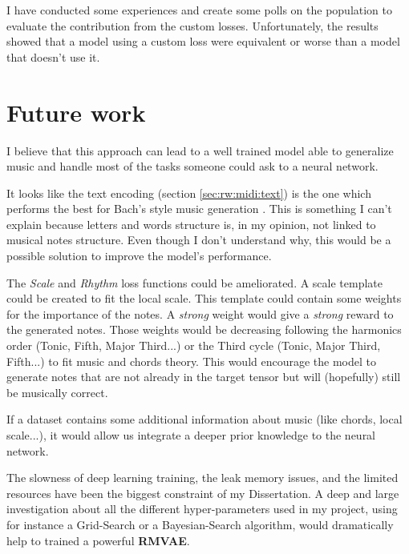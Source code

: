\documentclass[12pt]{report}
\begin{document}
I have conducted some experiences and create some polls on the population to evaluate the contribution from the custom losses.
Unfortunately, the results showed that a model using a custom loss were equivalent or worse than a model that doesn't use it.


\section*{Future work}

I believe that this approach can lead to a well trained model able to generalize music and handle most of the tasks someone could ask to a neural network.

It looks like the text encoding (section \ref{sec:rw:midi:text}) is the one which performs the best for Bach's style music generation \cite{hadjeres_deepbach:_2016, liang_automatic_2017}.
This is something I can't explain because letters and words structure is, in my opinion, not linked to musical notes structure.
Even though I don't understand why, this would be a possible solution to improve the model's performance.

The \textit{Scale} and \textit{Rhythm} loss functions could be ameliorated.
A scale template could be created to fit the local scale.
This template could contain some weights for the importance of the notes.
A \textit{strong} weight would give a \textit{strong} reward to the generated notes.
Those weights would be decreasing following the harmonics order (Tonic, Fifth, Major Third...) or the Third cycle (Tonic, Major Third, Fifth...) to fit music and chords theory.
This would encourage the model to generate notes that are not already in the target tensor but will (hopefully) still be musically correct.

If a dataset contains some additional information about music (like chords, local scale...), it would allow us integrate a deeper prior knowledge to the neural network.

The slowness of deep learning training, the leak memory issues, and the limited resources have been the biggest constraint of my Dissertation.
A deep and large investigation about all the different hyper-parameters used in my project, using for instance a Grid-Search or a Bayesian-Search algorithm, would dramatically help to trained a powerful \textbf{RMVAE}.
\end{document}
